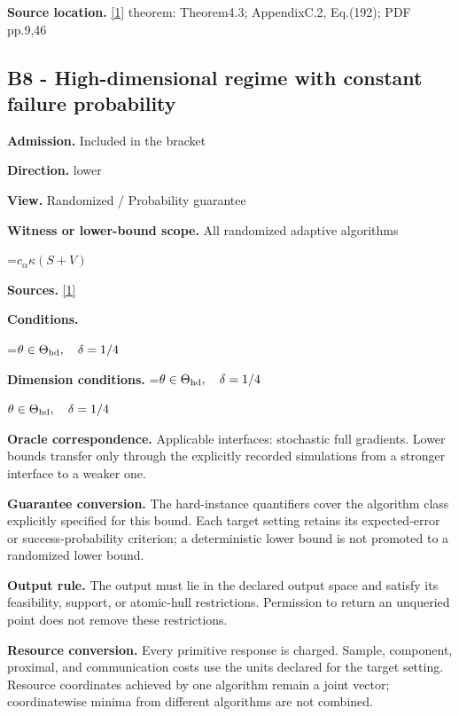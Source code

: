 \documentclass[10pt,a4paper]{article}
\newcommand{\AtlasMath}[1]{\par\begingroup\centering\setbox0=\hbox{$\displaystyle #1$}\ifdim\wd0>1.4\linewidth\typeout{ATLAS WIDE FORMULA: \the\wd0}\fi\ifdim\wd0>\linewidth\resizebox{\linewidth}{!}{\box0}\else\box0\fi\par\endgroup}
\newcommand{\AtlasInlineMath}[1]{\begingroup\setbox0=\hbox{$#1$}\ifdim\wd0>.4\linewidth\endgroup\AtlasMath{#1}\else\endgroup$#1$\fi}
\begin{document}
\textbf{Source location.} \href{https://arxiv.org/pdf/2609.03990}{[1]} theorem: Theorem4.3; AppendixC.2, Eq.(192); PDF pp.9,46



\subsection{B8 - High-dimensional regime with constant failure probability}


\textbf{Admission.} Included in the bracket



\textbf{Direction.} lower



\textbf{View.} Randomized / Probability guarantee



\textbf{Witness or lower-bound scope.} All randomized adaptive algorithms



\AtlasMath{c_\alpha\kappa(S+V)}


\textbf{Sources.} \href{https://arxiv.org/pdf/2609.03990}{[1]}



\textbf{Conditions.}
\AtlasMath{\theta\in\Theta_{\rm hd},\quad\delta=1/4}




\textbf{Dimension conditions.} \AtlasInlineMath{\theta\in\Theta_{\rm hd},\quad\delta=1/4}



\textbf{Oracle correspondence.} Applicable interfaces: stochastic full gradients. Lower bounds transfer only through the explicitly recorded simulations from a stronger interface to a weaker one.



\textbf{Guarantee conversion.} The hard-instance quantifiers cover the algorithm class explicitly specified for this bound. Each target setting retains its expected-error or success-probability criterion; a deterministic lower bound is not promoted to a randomized lower bound.



\textbf{Output rule.} The output must lie in the declared output space and satisfy its feasibility, support, or atomic-hull restrictions. Permission to return an unqueried point does not remove these restrictions.



\textbf{Resource conversion.} Every primitive response is charged. Sample, component, proximal, and communication costs use the units declared for the target setting. Resource coordinates achieved by one algorithm remain a joint vector; coordinatewise minima from different algorithms are not combined.
\end{document}
